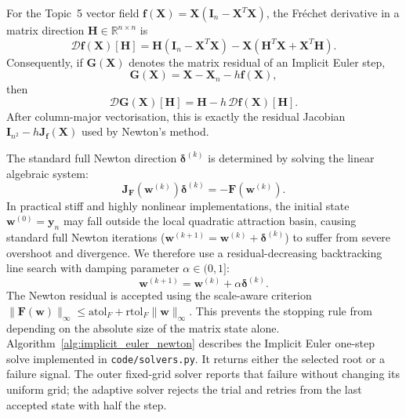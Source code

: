For the Topic~5 vector field
$\mathbf{f}(\mathbf{X})=\mathbf{X}(\mathbf{I}_n-\mathbf{X}^T\mathbf{X})$,
the Fr\'echet derivative in a matrix direction
$\mathbf{H}\in\mathbb{R}^{n\times n}$ is
\begin{equation}
\label{eq:topic5_frechet_derivative}
\mathcal{D}\mathbf{f}(\mathbf{X})[\mathbf{H}]
=\mathbf{H}(\mathbf{I}_n-\mathbf{X}^T\mathbf{X})
-\mathbf{X}(\mathbf{H}^T\mathbf{X}+\mathbf{X}^T\mathbf{H}).
\end{equation}
Consequently, if $\mathbf{G}(\mathbf{X})$ denotes the matrix residual of
an Implicit Euler step,
\begin{equation}
\label{eq:topic5_matrix_residual}
\mathbf{G}(\mathbf{X})=\mathbf{X}-\mathbf{X}_n-h\mathbf{f}(\mathbf{X}),
\end{equation}
then
\begin{equation}
\label{eq:topic5_residual_frechet}
\mathcal{D}\mathbf{G}(\mathbf{X})[\mathbf{H}]
=\mathbf{H}-h\,\mathcal{D}\mathbf{f}(\mathbf{X})[\mathbf{H}].
\end{equation}
After column-major vectorisation, this is exactly the residual Jacobian
$\mathbf{I}_{n^2}-h\mathbf{J}_{\mathbf f}(\mathbf X)$ used by Newton's method.

The standard full Newton direction $\boldsymbol{\delta}^{(k)}$ is determined by solving the linear algebraic system:
\begin{equation}
\label{eq:newton_linear_system}
\mathbf{J}_{\mathbf{F}}\left(\mathbf{w}^{(k)}\right) \boldsymbol{\delta}^{(k)} = -\mathbf{F}\left(\mathbf{w}^{(k)}\right).
\end{equation}
In practical stiff and highly nonlinear implementations, the initial state $\mathbf{w}^{(0)} = \mathbf{y}_n$ may fall outside the local quadratic attraction basin, causing standard full Newton iterations ($\mathbf{w}^{(k+1)} = \mathbf{w}^{(k)} + \boldsymbol{\delta}^{(k)}$) to suffer from severe overshoot and divergence. We therefore use a residual-decreasing backtracking line search with damping parameter $\alpha \in (0,1]$:
\begin{equation}
\label{eq:newton_damped_update}
\mathbf{w}^{(k+1)} = \mathbf{w}^{(k)} + \alpha \boldsymbol{\delta}^{(k)}.
\end{equation}
The Newton residual is accepted using the scale-aware criterion
$\|\mathbf{F}(\mathbf{w})\|_\infty\le
\mathrm{atol}_F+\mathrm{rtol}_F\|\mathbf{w}\|_\infty$.
This prevents the stopping rule from depending on the absolute size of
the matrix state alone.
Algorithm~\ref{alg:implicit_euler_newton} describes the Implicit Euler
one-step solve implemented in \texttt{code/solvers.py}. It returns either
the selected root or a failure signal. The outer fixed-grid solver reports
that failure without changing its uniform grid; the adaptive solver rejects
the trial and retries from the last accepted state with half the step.


